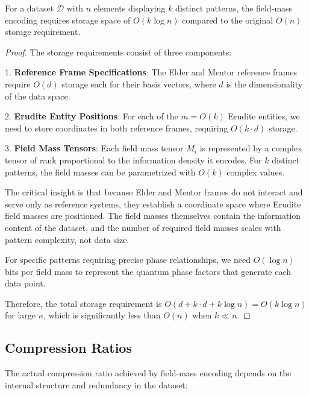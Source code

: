 \begin{theorem}
For a dataset $\mathcal{D}$ with $n$ elements displaying $k$ distinct patterns, the field-mass encoding requires storage space of $O(k \log n)$ compared to the original $O(n)$ storage requirement.
\end{theorem}

\begin{proof}
The storage requirements consist of three components:

1. \textbf{Reference Frame Specifications}: The Elder and Mentor reference frames require $O(d)$ storage each for their basis vectors, where $d$ is the dimensionality of the data space.

2. \textbf{Erudite Entity Positions}: For each of the $m = O(k)$ Erudite entities, we need to store coordinates in both reference frames, requiring $O(k \cdot d)$ storage.

3. \textbf{Field Mass Tensors}: Each field mass tensor $M_i$ is represented by a complex tensor of rank proportional to the information density it encodes. For $k$ distinct patterns, the field masses can be parametrized with $O(k)$ complex values.

The critical insight is that because Elder and Mentor frames do not interact and serve only as reference systems, they establish a coordinate space where Erudite field masses are positioned. The field masses themselves contain the information content of the dataset, and the number of required field masses scales with pattern complexity, not data size.

For specific patterns requiring precise phase relationships, we need $O(\log n)$ bits per field mass to represent the quantum phase factors that generate each data point.

Therefore, the total storage requirement is $O(d + k \cdot d + k \log n) = O(k \log n)$ for large $n$, which is significantly less than $O(n)$ when $k \ll n$.
\end{proof}

\subsection{Compression Ratios}

The actual compression ratio achieved by field-mass encoding depends on the internal structure and redundancy in the dataset:

